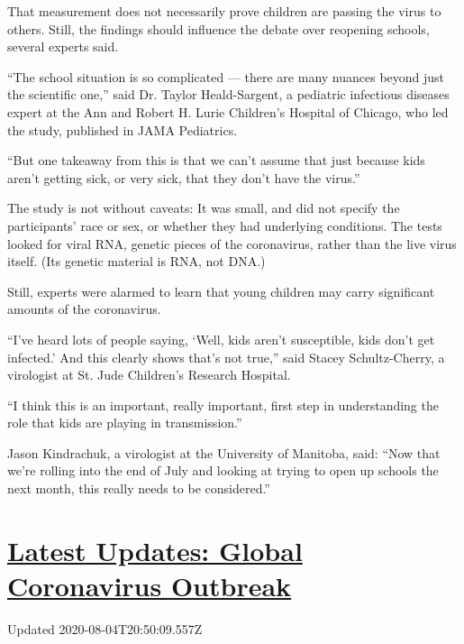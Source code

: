 That measurement does not necessarily prove children are passing the
virus to others. Still, the findings should influence the debate over
reopening schools, several experts said.

``The school situation is so complicated --- there are many nuances
beyond just the scientific one,'' said Dr. Taylor Heald-Sargent, a
pediatric infectious diseases expert at the Ann and Robert H. Lurie
Children's Hospital of Chicago, who led the study, published in JAMA
Pediatrics.

``But one takeaway from this is that we can't assume that just because
kids aren't getting sick, or very sick, that they don't have the
virus.''

The study is not without caveats: It was small, and did not specify the
participants' race or sex, or whether they had underlying conditions.
The tests looked for viral RNA, genetic pieces of the coronavirus,
rather than the live virus itself. (Its genetic material is RNA, not
DNA.)

Still, experts were alarmed to learn that young children may carry
significant amounts of the coronavirus.

``I've heard lots of people saying, `Well, kids aren't susceptible, kids
don't get infected.' And this clearly shows that's not true,'' said
Stacey Schultz-Cherry, a virologist at St. Jude Children's Research
Hospital.

``I think this is an important, really important, first step in
understanding the role that kids are playing in transmission.''

Jason Kindrachuk, a virologist at the University of Manitoba, said:
``Now that we're rolling into the end of July and looking at trying to
open up schools the next month, this really needs to be considered.''

\hypertarget{latest-updates-global-coronavirus-outbreak}{%
\section{\texorpdfstring{\href{https://www.nytimes.com/2020/08/04/world/coronavirus-cases.html?action=click\&pgtype=Article\&state=default\&region=MAIN_CONTENT_1\&context=storylines_live_updates}{Latest
Updates: Global Coronavirus
Outbreak}}{Latest Updates: Global Coronavirus Outbreak}}\label{latest-updates-global-coronavirus-outbreak}}

Updated 2020-08-04T20:50:09.557Z

